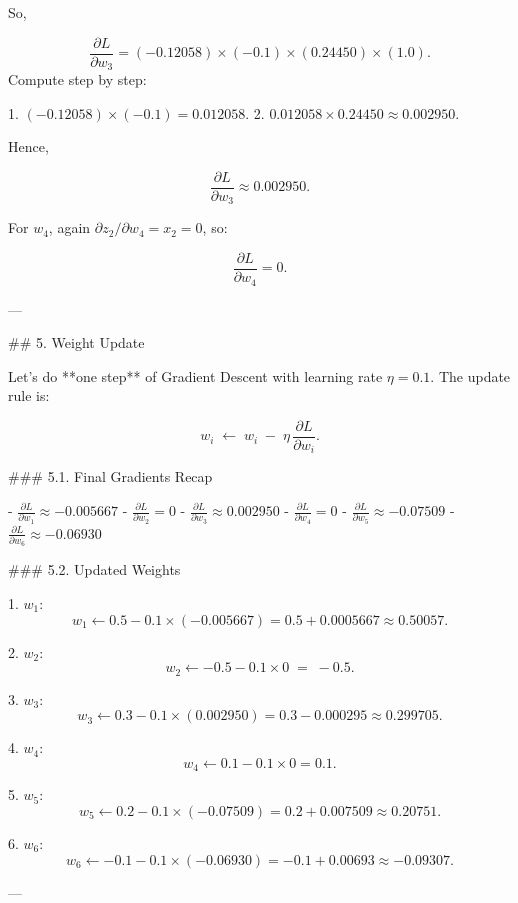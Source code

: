So,

\[
  \frac{\partial L}{\partial w_3}
  = (-0.12058)\times(-0.1)\times(0.24450)\times(1.0).
\]
Compute step by step:

1. \((-0.12058)\times(-0.1) = 0.012058.\)
2. \(0.012058 \times 0.24450 \approx 0.002950.\)

Hence,

\[
  \frac{\partial L}{\partial w_3} \approx 0.002950.
\]

For \(w_4\), again \(\partial z_2/\partial w_4 = x_2 = 0\), so:

\[
  \frac{\partial L}{\partial w_4} = 0.
\]

---

## 5. Weight Update

Let’s do **one step** of Gradient Descent with learning rate \(\eta = 0.1\). The update rule is:

\[
  w_i \;\leftarrow\; w_i \;-\; \eta\,\frac{\partial L}{\partial w_i}.
\]

### 5.1. Final Gradients Recap

- \(\displaystyle \frac{\partial L}{\partial w_1} \approx -0.005667\)  
- \(\displaystyle \frac{\partial L}{\partial w_2} = 0\)  
- \(\displaystyle \frac{\partial L}{\partial w_3} \approx 0.002950\)  
- \(\displaystyle \frac{\partial L}{\partial w_4} = 0\)  
- \(\displaystyle \frac{\partial L}{\partial w_5} \approx -0.07509\)  
- \(\displaystyle \frac{\partial L}{\partial w_6} \approx -0.06930\)

### 5.2. Updated Weights

1. \(\displaystyle w_1\):
   \[
     w_1 \leftarrow 0.5 - 0.1\times(-0.005667)
           = 0.5 + 0.0005667
           \approx 0.50057.
   \]

2. \(\displaystyle w_2\):
   \[
     w_2 \leftarrow -0.5 - 0.1\times 0 \;=\; -0.5.
   \]

3. \(\displaystyle w_3\):
   \[
     w_3 \leftarrow 0.3 - 0.1\times(0.002950)
           = 0.3 - 0.000295
           \approx 0.299705.
   \]

4. \(\displaystyle w_4\):
   \[
     w_4 \leftarrow 0.1 - 0.1\times 0 = 0.1.
   \]

5. \(\displaystyle w_5\):
   \[
     w_5 \leftarrow 0.2 - 0.1\times(-0.07509)
           = 0.2 + 0.007509
           \approx 0.20751.
   \]

6. \(\displaystyle w_6\):
   \[
     w_6 \leftarrow -0.1 - 0.1\times(-0.06930)
           = -0.1 + 0.00693
           \approx -0.09307.
   \]

---

